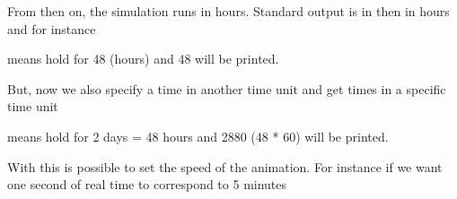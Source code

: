 \documentclass[letterpaper,10pt,english]{sphinxmanual}
\begin{document}
%
\begin{sphinxVerbatim}[commandchars=\\\{\}]
  
\end{sphinxVerbatim}

From then on, the simulation runs in hours. Standard output is in then in hours and for instance

%
\begin{sphinxVerbatim}[commandchars=\\\{\}]
 
  
\end{sphinxVerbatim}

means hold for 48 (hours) and 48 will be printed.

But, now we also specify a time in another time unit and get times in a specific time unit

%
\begin{sphinxVerbatim}[commandchars=\\\{\}]
 
  
\end{sphinxVerbatim}

means hold for 2 days = 48 hours and 2880 (48 * 60) will be printed.

With this is possible to set the speed of the animation. For instance if we want one second of real time to
correspond to 5 minutes

%
\begin{sphinxVerbatim}[commandchars=\\\{\}]
\end{sphinxVerbatim}
\end{document}
